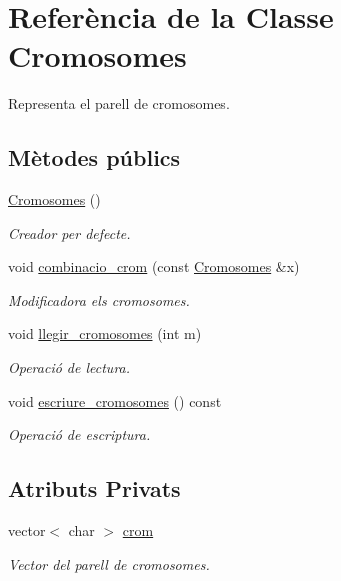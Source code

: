 \hypertarget{class_cromosomes}{}\section{Referència de la Classe Cromosomes}
\label{class_cromosomes}


Representa el parell de cromosomes.  


\subsection*{Mètodes públics}
\begin{DoxyCompactItemize}
\item 
\hyperlink{class_cromosomes_a117e49dbba6fef6e75d5ba774e1bd24a}{Cromosomes} ()
\begin{DoxyCompactList}\small\item\em Creador per defecte. \end{DoxyCompactList}\item 
void \hyperlink{class_cromosomes_a3453b58fad109a8317018f8349852d55}{combinacio\+\_\+crom} (const \hyperlink{class_cromosomes}{Cromosomes} \&x)
\begin{DoxyCompactList}\small\item\em Modificadora els cromosomes. \end{DoxyCompactList}\item 
void \hyperlink{class_cromosomes_ae475f91a7ebbe2b6253f2cf87e05d05c}{llegir\+\_\+cromosomes} (int m)
\begin{DoxyCompactList}\small\item\em Operació de lectura. \end{DoxyCompactList}\item 
void \hyperlink{class_cromosomes_a82634290c5bd73c827034902404c90cf}{escriure\+\_\+cromosomes} () const 
\begin{DoxyCompactList}\small\item\em Operació de escriptura. \end{DoxyCompactList}\end{DoxyCompactItemize}
\subsection*{Atributs Privats}
\begin{DoxyCompactItemize}
\item 
vector$<$ char $>$ \hyperlink{class_cromosomes_a663df9407657383482e40832eca6e91a}{crom}
\begin{DoxyCompactList}\small\item\em Vector del parell de cromosomes. \end{DoxyCompactList}\end{DoxyCompactItemize}



